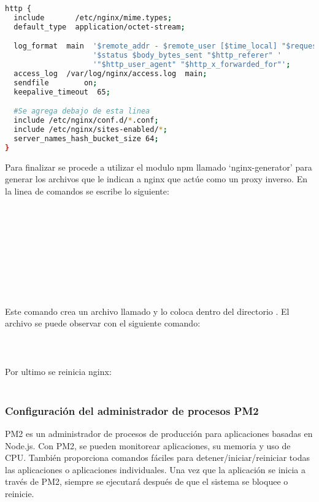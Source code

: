 \begin{lstlisting}[language=bash, caption=Fragmento de configuración nginx]
http {
  include       /etc/nginx/mime.types;
  default_type  application/octet-stream;

  log_format  main  '$remote_addr - $remote_user [$time_local] "$request" '
                    '$status $body_bytes_sent "$http_referer" '
                    '"$http_user_agent" "$http_x_forwarded_for"';
  access_log  /var/log/nginx/access.log  main;
  sendfile        on;
  keepalive_timeout  65;

  #Se agrega debajo de esta linea
  include /etc/nginx/conf.d/*.conf;
  include /etc/nginx/sites-enabled/*;
  server_names_hash_bucket_size 64;
}
\end{lstlisting}

Para finalizar se procede a utilizar el modulo npm llamado `nginx-generator' para generar los archivos que le indican a nginx que actúe como un proxy inverso. En la linea de comandos se escribe lo siguiente:\\
\\
\\
\\
\\
\\
\\
\\
\\
\\
Este comando crea un archivo llamado  y lo coloca dentro del directorio . El archivo se puede observar con el siguiente comando:\\
\\
\\
\\
Por ultimo se reinicia nginx:\\
\\

\subsubsection{Configuración del administrador de procesos PM2}
PM2 es un administrador de procesos de producción para aplicaciones basadas en Node.js. Con PM2, se pueden monitorear aplicaciones, su memoria y uso de CPU. También proporciona comandos fáciles para detener/iniciar/reiniciar todas las aplicaciones o aplicaciones individuales. Una vez que la aplicación se inicia a través de PM2, siempre se ejecutará después de que el sistema se bloquee o reinicie.
\vspace{0.8cm}

